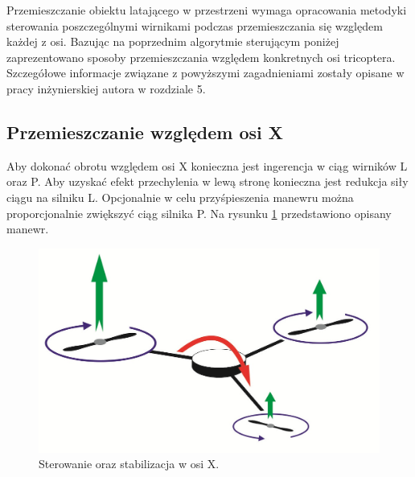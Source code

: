 Przemieszczanie obiektu latającego w przestrzeni wymaga opracowania metodyki sterowania poszczególnymi wirnikami podczas przemieszczania się względem każdej z osi.
Bazując na poprzednim algorytmie sterującym poniżej zaprezentowano sposoby przemieszczania względem konkretnych osi tricoptera. Szczegółowe informacje związane z powyższymi zagadnieniami zostały opisane w pracy inżynierskiej autora w rozdziale 5. %

\subsection{Przemieszczanie względem osi X}
Aby dokonać obrotu względem osi X konieczna jest ingerencja w ciąg wirników L oraz P. Aby uzyskać efekt przechylenia w lewą stronę konieczna jest redukcja siły ciągu na silniku L. Opcjonalnie w celu przyśpieszenia manewru można proporcjonalnie zwiększyć ciąg silnika P. Na rysunku \ref{fig:axis_x} przedstawiono opisany manewr.

\begin{figure}[!htbp]
\centering
\includegraphics[width=0.7\linewidth]{./include/axis_x}
\caption{Sterowanie oraz stabilizacja w osi X.}
\label{fig:axis_x}
\end{figure}


